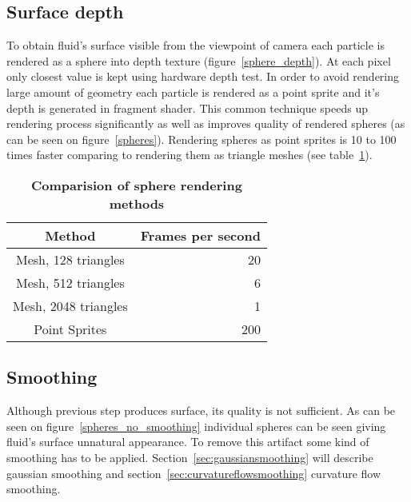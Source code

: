 \subsection{Surface depth} \label{sec:surfacedepth}
To obtain fluid's surface visible from the viewpoint of camera each particle is rendered as a sphere into depth texture (figure~\ref{sphere_depth}). At each pixel only closest value is kept using hardware depth test. 
In order to avoid rendering large amount of geometry each particle is rendered as a point sprite and it's depth is generated in fragment shader. This common technique speeds up rendering process significantly as well as improves quality of rendered spheres (as can be seen on figure~\ref{spheres}). Rendering spheres as point sprites is 10 to 100 times faster comparing to rendering them as triangle meshes (see table~\ref{sphere_speed_comp}).
\begin{table}[htdp]
\caption[Comparision of sphere rendering methods]{\textbf{Comparision of sphere rendering methods}}
\centering
\begin{tabular}{cr} 
{\bf Method} & {\bf Frames per second} \\ 
\hline 
Mesh, 128 triangles & 20 \\
Mesh, 512 triangles & 6 \\
Mesh, 2048 triangles   & 1 \\
Point Sprites & 200 \\
\end{tabular}
\label{sphere_speed_comp}
\end{table}

\subsection{Smoothing} 
\label{sec:smoothing}
Although previous step produces surface, its quality is not sufficient. As can be seen on figure~\ref{spheres_no_smoothing} individual spheres can be seen giving fluid's surface unnatural appearance. To remove this artifact some kind of smoothing has to be applied. Section~\ref{sec:gaussiansmoothing} will describe gaussian smoothing and section~\ref{sec:curvatureflowsmoothing} curvature flow smoothing.

